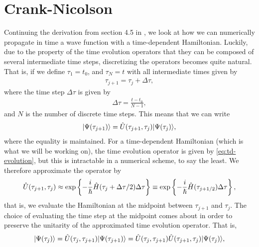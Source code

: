     \section{Crank-Nicolson}
        Continuing the derivation from section 4.5 in
        \citeauthor{ullrich2011time} \cite{ullrich2011time}, we look at how we
        can numerically propagate in time a wave function with a time-dependent
        Hamiltonian.
        Luckily, due to the property of the time evolution operators that they
        can be composed of several intermediate time steps, discretizing the
        operators becomes quite natural.
        That is, if we define $\tau_1 = t_0$, and $\tau_N = t$ with all
        intermediate times given by
        \begin{align}
            \tau_{j + 1} = \tau_j + \Delta \tau,
        \end{align}
        where the time step $\Delta \tau$ is given by
        \begin{align}
            \Delta \tau = \frac{t - t_0}{N - 1},
        \end{align}
        and $N$ is the number of discrete time steps. This means that we can
        write
        \begin{align}
            | \Psi(\tau_{j + 1}) \rangle
            = \hat{U}(\tau_{j + 1}, \tau_{j})| \Psi(\tau_j) \rangle,
        \end{align}
        where the equality is maintained. For a time-dependent Hamiltonian
        (which is what we will be working on), the time evolution operator is
        given by \autoref{eq:td-evolution}, but this is intractable in a
        numerical scheme, to say the least. We therefore approximate the
        operator by
        \begin{align}
            \hat{U}(\tau_{j + 1}, \tau_{j})
            \approx \exp\left\{ 
                -\frac{i}{\hslash}\hat{H}(\tau_{j} + \Delta\tau/2)\Delta\tau
             \right\}
            \equiv
            \exp\left\{ 
                -\frac{i}{\hslash}\hat{H}(\tau_{j + 1/2})\Delta\tau
             \right\},
        \end{align}
        that is, we evaluate the Hamiltonian at the midpoint between $\tau_{j +
        1}$ and $\tau_{j}$. The choice of evaluating the time step at the
        midpoint comes about in order to preserve the unitarity of the
        approximated time evolution operator. That is,
        \begin{align}
            | \Psi(\tau_j) \rangle
            = \hat{U}(\tau_j, \tau_{j + 1})| \Psi(\tau_{j + 1}) \rangle
            = \hat{U}(\tau_j, \tau_{j + 1})\hat{U}(\tau_{j + 1}, \tau_j)
            | \Psi(\tau_j) \rangle,
        \end{align}

